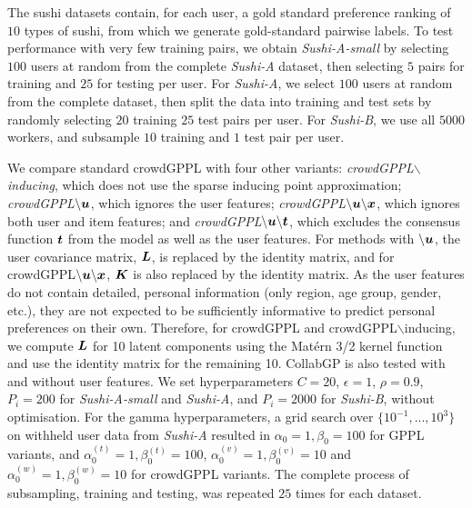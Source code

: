 The sushi datasets contain, for each user, a gold standard preference ranking 
of $10$ types of sushi,
from which we generate gold-standard pairwise labels. 
To test performance with very few training pairs, we obtain \emph{Sushi-A-small}
by selecting $100$ users at random from the complete \emph{Sushi-A} dataset,
then selecting $5$ pairs for training and $25$ for testing per user.
For \emph{Sushi-A}, we select $100$ users at random from the complete dataset, then 
split the data into training and test sets by randomly
selecting $20$ training $25$ test pairs per user. 
For \emph{Sushi-B}, we use all $5000$ workers, and subsample $10$ training and $1$ test pair per user.

We compare standard crowdGPPL with four other variants: 
\emph{crowdGPPL$\backslash$inducing}, which does 
not use the sparse inducing point approximation;
\emph{crowdGPPL$\mathbf{\backslash \boldsymbol u}$}, which ignores the user features;
 \emph{crowdGPPL$\mathbf{\backslash \boldsymbol u \backslash \boldsymbol x}$}, which ignores both user and item features;
 and
 \emph{crowdGPPL$\mathbf{\backslash \boldsymbol u \backslash \boldsymbol t}$}, which 
excludes the consensus function $\boldsymbol t$ from the model as well as the user
features. 
For methods with $\backslash\boldsymbol u$, the user covariance matrix, $\boldsymbol L$, 
is replaced by the identity matrix, 
and for crowdGPPL$\mathbf{\backslash \boldsymbol u \backslash \boldsymbol x}$, 
$\boldsymbol K$ is also replaced by the identity matrix.
As the user features do not contain detailed, personal information (only 
region, age group, gender, etc.), they are not expected
to be sufficiently informative to predict personal preferences on their own. 
Therefore, for crowdGPPL and crowdGPPL$\backslash$inducing, 
 we compute $\boldsymbol L$ for 10 latent components using
 the Mat\'ern 3/2 kernel function 
 and use the identity matrix for the remaining 10.
CollabGP is also tested with and without user features.
We set hyperparameters $C=20$,
$\epsilon=1$, $\rho=0.9$, $P_i=200$ for  \emph{Sushi-A-small} and \emph{Sushi-A},
 and $P_i=2000$ for \emph{Sushi-B},
without optimisation.
For the gamma hyperparameters,  a grid search over 
$\{10^{-1},...,10^3\}$ on withheld user data from \emph{Sushi-A}
resulted in $\alpha_0=1, \beta_0=100$ for GPPL variants, and 
$\alpha_0^{(t)}=1,\beta_0^{(t)}=100$, 
$\alpha_0^{(v)}=1,\beta_0^{(v)}=10$ and
$\alpha_0^{(w)}=1,\beta_0^{(w)}=10$ for crowdGPPL variants.
The complete process of subsampling, training and testing, was repeated $25$ times
for each dataset.

